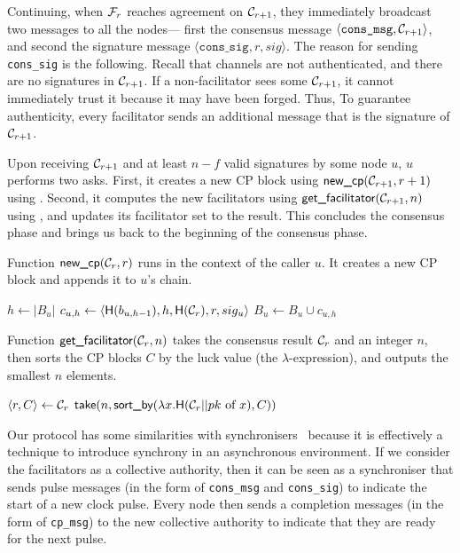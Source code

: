 Continuing, when $\mathcal{F}_{r}$ reaches agreement on $\mathcal{C}_{r+1}$,
they immediately broadcast two messages to all the nodes---
first the consensus message $\langle \texttt{cons\_msg}, \mathcal{C}_{r+1} \rangle$,
and second the signature message $\langle \texttt{cons\_sig}, r, sig \rangle$.
The reason for sending \texttt{cons\_sig} is the following.
Recall that channels are not authenticated, 
and there are no signatures in $\mathcal{C}_{r + 1}$.
If a non-facilitator sees some $\mathcal{C}_{r + 1}$, it cannot immediately trust it because it may have been forged.
Thus, To guarantee authenticity, every facilitator sends an additional message that is the signature of $\mathcal{C}_{r + 1}$.

Upon receiving $\mathcal{C}_{r + 1}$ and at least $n - f$ valid signatures by some node $u$, $u$ performs two asks.
First, it creates a new CP block using $\textsf{new\_cp}(\mathcal{C}_{r + 1}, r + 1)$ using .
Second, it computes the new facilitators using $\textsf{get\_facilitator}(\mathcal{C}_{r + 1}, n)$ using ,
and updates its facilitator set to the result.
This concludes the consensus phase and brings us back to the beginning of the consensus phase.

\begin{algorithm}
\caption{Function $\textsf{new\_cp}(\mathcal{C}_r, r)$ runs in the context of the caller $u$.
It creates a new CP block and appends it to $u$'s chain.}
\label{alg:new-cp}
\begin{algorithmic}
\State $h \gets |B_u|$
\State $c_{u, h} \gets \langle \textsf{H}(b_{u, h-1}), h, \textsf{H}(\mathcal{C}_r), r, sig_u \rangle$
\State $B_u \gets B_u \cup c_{u, h}$
\end{algorithmic}
\end{algorithm}

\begin{algorithm}
\caption{Function $\textsf{get\_facilitator}(\mathcal{C}_r, n)$ takes the consensus result $\mathcal{C}_r$ and an integer $n$,
then sorts the CP blocks $C$ by the luck value (the $\lambda$-expression), and outputs the smallest $n$ elements.}
\label{alg:facilitator}
\begin{algorithmic}
\State $\langle r, C \rangle \gets \mathcal{C}_r$
\State $\textsf{take} (n, \textsf{sort\_by} (\lambda x.\textsf{H}(\mathcal{C}_r || pk \text{ of } x), C))$
\end{algorithmic}
\end{algorithm}


Our protocol has some similarities with synchronisers~\cite[Chapter 10]{podc} because it is effectively a technique to introduce synchrony in an asynchronous environment.
If we consider the facilitators as a collective authority, then it can be seen as a synchroniser that sends pulse messages (in the form of \texttt{cons\_msg} and \texttt{cons\_sig}) to indicate the start of a new clock pulse.
Every node then sends a completion messages (in the form of \texttt{cp\_msg}) to the new collective authority to indicate that they are ready for the next pulse.


